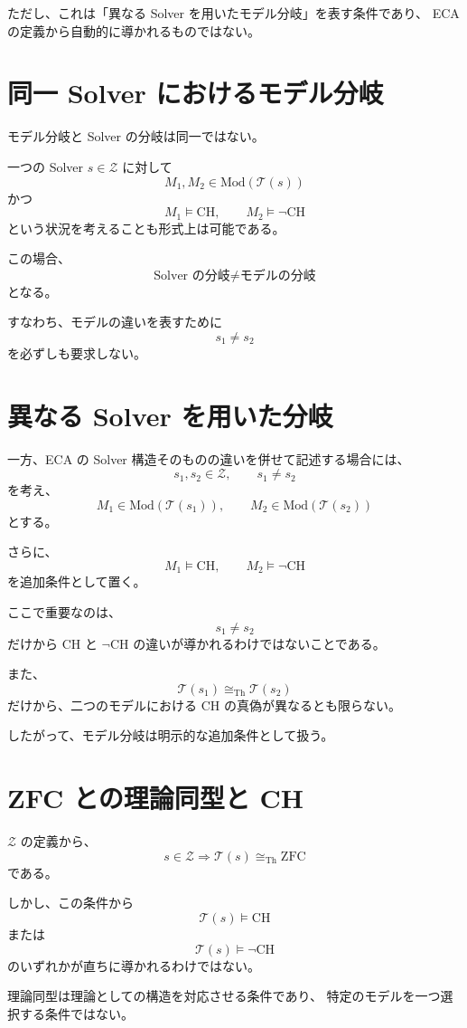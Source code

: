 \documentclass[a4paper,11pt]{jsarticle}
\newcommand{\Mod}{\mathrm{Mod}}
\begin{document}
ただし、これは「異なる Solver を用いたモデル分岐」を表す条件であり、
ECA の定義から自動的に導かれるものではない。

\section{同一 Solver におけるモデル分岐}

モデル分岐と Solver の分岐は同一ではない。

一つの Solver $s\in\mathcal{Z}$ に対して
\[
M_1,M_2\in\Mod(\mathcal{T}(s))
\]
かつ
\[
M_1\models\mathrm{CH},
\qquad
M_2\models\neg\mathrm{CH}
\]
という状況を考えることも形式上は可能である。

この場合、
\[
\boxed{\text{Solver の分岐}\neq\text{モデルの分岐}}
\]
となる。

すなわち、モデルの違いを表すために
\[
s_1\neq s_2
\]
を必ずしも要求しない。

\section{異なる Solver を用いた分岐}

一方、ECA の Solver 構造そのものの違いを併せて記述する場合には、
\[
s_1,s_2\in\mathcal{Z},
\qquad s_1\neq s_2
\]
を考え、
\[
M_1\in\Mod(\mathcal{T}(s_1)),
\qquad
M_2\in\Mod(\mathcal{T}(s_2))
\]
とする。

さらに、
\[
M_1\models\mathrm{CH},
\qquad
M_2\models\neg\mathrm{CH}
\]
を追加条件として置く。

ここで重要なのは、
\[
s_1\neq s_2
\]
だけから CH と $\neg$CH の違いが導かれるわけではないことである。

また、
\[
\mathcal{T}(s_1)\cong_{\mathrm{Th}}\mathcal{T}(s_2)
\]
だけから、二つのモデルにおける CH の真偽が異なるとも限らない。

したがって、モデル分岐は明示的な追加条件として扱う。

\section{ZFC との理論同型と CH}

$\mathcal{Z}$ の定義から、
\[
s\in\mathcal{Z}
\Longrightarrow
\mathcal{T}(s)\cong_{\mathrm{Th}}\mathrm{ZFC}
\]
である。

しかし、この条件から
\[
\mathcal{T}(s)\models\mathrm{CH}
\]
または
\[
\mathcal{T}(s)\models\neg\mathrm{CH}
\]
のいずれかが直ちに導かれるわけではない。

理論同型は理論としての構造を対応させる条件であり、
特定のモデルを一つ選択する条件ではない。
\end{document}
